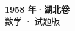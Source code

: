 \documentclass[zihao=-4, a4paper]{ctexart}
\begin{document}
\begin{center}
  {\Large\bfseries 1958 年·湖北卷}\\[4pt]
  {\large 数学 · 试题版}
\end{center}
\medskip
{}

\end{document}

